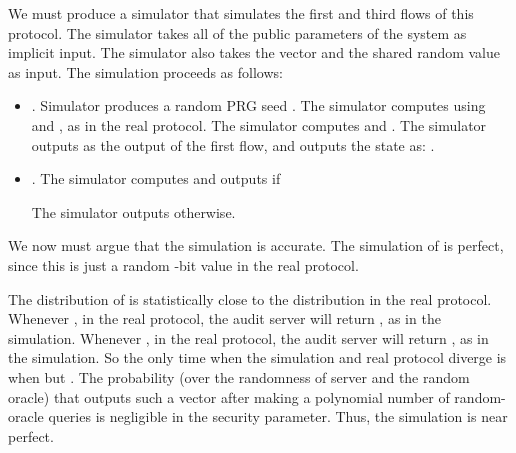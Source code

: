 \documentclass[10pt,twocolumn]{article}
\begin{document}
We must produce a simulator  that simulates the first
and third flows of this protocol.
The simulator takes all of the public parameters of the system as implicit
input.
The simulator also takes the vector  and the shared random value
 as input.
The simulation proceeds as follows:
\begin{itemize}
  \item . 
        Simulator  produces a random PRG seed
        . 
        The simulator computes  using  and , 
        as in the real protocol.
        The simulator computes 
        and .
        The simulator outputs  as the output of the first flow, and outputs
        the state as:
        .
      \item .
        The simulator computes  and outputs
         if 
        
        The simulator outputs
         otherwise.
\end{itemize}

We now must argue that the simulation is accurate.
The simulation of  is perfect, since
this is just a random -bit value in the real protocol.

The distribution of  is 
statistically close to the distribution in the real protocol.
Whenever , in the real protocol, the audit
server will return , as in the simulation.
Whenever , in the real protocol, the audit
server will return , as in the simulation.
So the only time when the simulation and real protocol diverge
is when  but .
The probability (over the randomness of server  and 
the random oracle) that  outputs such a vector 
after making a polynomial number of random-oracle queries
is negligible in the security parameter.
Thus, the simulation is near perfect.
\end{document}
